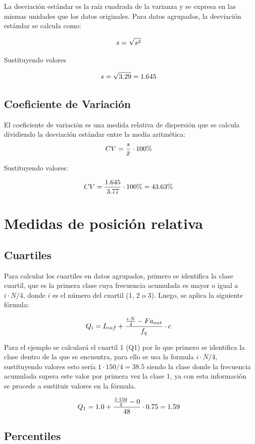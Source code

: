 \documentclass[
  spanish,
  letterpaper,
]{book}
\begin{document}
La desviación estándar es la raíz cuadrada de la varianza y se expresa
en las mismas unidades que los datos originales. Para datos agrupados,
la desviación estándar se calcula como:

\[\huge s = \sqrt{s^2}\]

Sustituyendo valores

\[\huge s = \sqrt{3.29}=1.645\]

\subsection{Coeficiente de
Variación}\label{coeficiente-de-variaciuxf3n-3}

El coeficiente de variación es una medida relativa de dispersión que se
calcula dividiendo la desviación estándar entre la media aritmética:
\[ \huge CV = \frac{s}{\bar{x}} \cdot 100\%\]

Sustituyendo valores:

\[ \huge CV = \frac{1.645}{3.77} \cdot 100\%=43.63\%\]

\section{Medidas de posición
relativa}\label{medidas-de-posiciuxf3n-relativa-2}

\subsection{Cuartiles}\label{cuartiles-3}

Para calcular los cuartiles en datos agrupados, primero se identifica la
clase cuartil, que es la primera clase cuya frecuencia acumulada es
mayor o igual a~\(i⋅N/4\), donde \(i\) es el número del cuartil (1, 2 o
3). Luego, se aplica la siguiente fórmula:

\[\huge Q_i = L_{inf} + \frac{\frac{i \cdot N}{4} - Fa_{ant}}{f_q} \cdot c\]

Para el ejemplo se calculará el cuartil 1 (Q1) por lo que primero se
identifica la clase dentro de la que se encuentra, para ello se usa la
formula \(i⋅N/4\), sustituyendo valores esto sería \(1\cdot 150/4=38.5\)
siendo la clase donde la frecuencia acumulada supera este valor por
primera vez la clase 1, ya con esta información se procede a sustituir
valores en la fórmula.

\[\huge Q_1 = 1.0 + \frac{\frac{1 \cdot 150}{4} - 0}{48} \cdot 0.75=1.59\]

\subsection{Percentiles}\label{percentiles-3}
\end{document}
